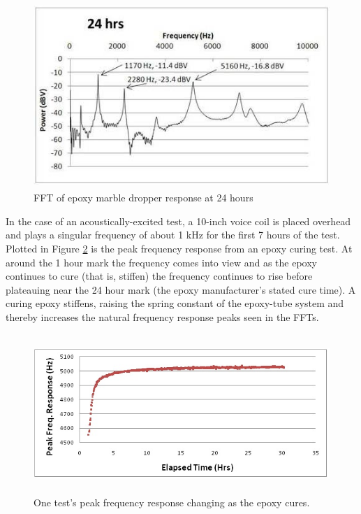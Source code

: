 \documentclass[]{aiaa-tc}%
\begin{document}
\begin{figure}[H]%
\centering
 \includegraphics[height = 7cm]{epoxy_24hr}
 \caption{FFT of epoxy marble dropper response at 24 hours}
 \label{fig:epoxy_24hr}
\end{figure}

  In the case of an acoustically-excited test, a 10-inch voice coil is placed overhead and plays a singular frequency of about 1 kHz for the first 7 hours of the test. Plotted in Figure \ref{fig:epoxy_fft_no_sound} is the peak frequency response from an epoxy curing test.  At around the 1 hour mark the frequency comes into view and as the epoxy continues to cure (that is, stiffen) the frequency continues to rise before plateauing near the 24 hour mark (the epoxy manufacturer's stated cure time).  A curing epoxy stiffens, raising the spring constant of the epoxy-tube system and thereby increases the natural frequency response peaks seen in the FFTs.


\begin{figure}[H]%
\centering
 \includegraphics[height = 6cm]{fft_epoxy}
 \caption{One test's peak frequency response changing as the epoxy cures.}
 \label{fig:epoxy_fft_no_sound}
\end{figure}
\end{document}
